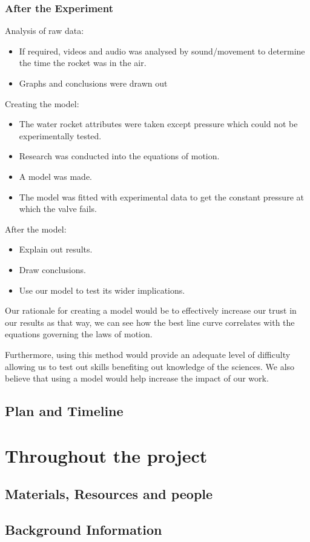 \documentclass[14pt]{article}
\begin{document}
\subsubsection{After the Experiment}
Analysis of raw data:
\begin{itemize}
    \item If required, videos and audio was analysed by sound/movement to determine the time the rocket was in the air.
    \item Graphs and conclusions were drawn out
\end{itemize}
Creating the model:
\begin{itemize}
    \item The water rocket attributes were taken except pressure which could not be experimentally tested.
    \item Research was conducted into the equations of motion.
    \item A model was made.
    \item The model was fitted with experimental data to get the constant pressure at which the valve fails.
\end{itemize}
After the model:
\begin{itemize}
    \item Explain out results.
    \item Draw conclusions.
    \item Use our model to test its wider implications.
\end{itemize}
Our rationale for creating a model would be to effectively increase our trust in our results as that way, we can see how the best line curve correlates with the equations governing the laws of motion.

Furthermore, using this method would provide an adequate level of difficulty allowing us to test out skills benefiting out knowledge of the sciences. We also believe that using a model would help increase the impact of our work.
\subsection{Plan and Timeline}
\section{Throughout the project}
\subsection{Materials, Resources and people}
\subsection{Background Information}
\end{document}
